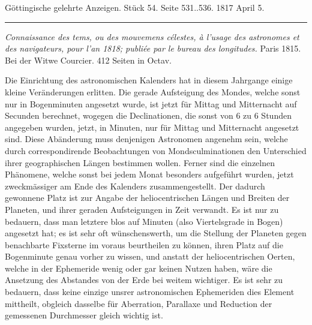 \clearpage
{}
\hypertarget{native-600-lower}{}

\begin{center}\small Göttingische gelehrte Anzeigen. Stück 54. Seite 531..536. 1817 April 5.\\[3pt]\rule{.72\linewidth}{.3pt}\end{center}

\emph{Connaissance des tems, ou des mouvemens célestes, à l'usage des astronomes et des navigateurs, pour l'an \textup{1818}; publiée par le bureau des longitudes.} Paris 1815. Bei der Witwe Courcier. 412 Seiten in Octav.

Die Einrichtung des astronomischen Kalenders hat in diesem Jahrgange einige kleine Veränderungen erlitten. Die gerade Aufsteigung des Mondes, welche sonst nur in Bogenminuten angesetzt wurde, ist jetzt für Mittag und Mitternacht auf Secunden berechnet, wogegen die Declinationen, die sonst von 6 zu 6 Stunden angegeben wurden, jetzt, in Minuten, nur für Mittag und Mitternacht angesetzt sind. Diese Abänderung muss denjenigen Astronomen angenehm sein, welche durch correspondirende Beobachtungen von Mondsculminationen den Unterschied ihrer geographischen Längen bestimmen wollen. Ferner sind die einzelnen Phänomene, welche sonst bei jedem Monat besonders aufgeführt wurden, jetzt zweckmässiger am Ende des Kalenders zusammengestellt. Der dadurch gewonnene Platz ist zur Angabe der heliocentrischen Längen und Breiten der Planeten, und ihrer geraden Aufsteigungen in Zeit verwandt. Es ist nur zu bedauern, dass man letztere blos auf Minuten (also Viertelsgrade in Bogen) angesetzt hat; es ist sehr oft wünschenswerth, um die Stellung der Planeten gegen benachbarte Fixsterne im voraus beurtheilen zu können, ihren Platz auf die Bogenminute genau vorher zu wissen, und anstatt der heliocentrischen Oerten, welche in der Ephemeride wenig oder gar keinen Nutzen haben, wäre die Ansetzung des Abstandes von der Erde bei weitem wichtiger. Es ist sehr zu bedauern, dass keine einzige unsrer astronomischen Ephemeriden dies Element mittheilt, obgleich dasselbe für Aberration, Parallaxe und Reduction der gemessenen Durchmesser gleich wichtig ist.

